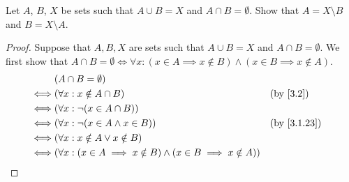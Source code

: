 \begin{ex}\label{ex:3.1.9}
  Let \(A\), \(B\), \(X\) be sets such that \(A \cup B = X\) and \(A \cap B = \emptyset\).
  Show that \(A = X \setminus B\) and \(B = X \setminus A\).
\end{ex}

\begin{proof}
  Suppose that \(A, B, X\) are sets such that \(A \cup B = X\) and \(A \cap B = \emptyset\).
  We first show that \(A \cap B = \emptyset \iff \forall x : (x \in A \implies x \notin B) \land (x \in B \implies x \notin A)\).
  \begin{align*}
         & (A \cap B = \emptyset)                                                                                         \\
    \iff & (\forall x : x \notin A \cap B)                                                 &  & \text{(by \cref{3.2})}    \\
    \iff & (\forall x : \lnot (x \in A \cap B))                                                                           \\
    \iff & (\forall x : \lnot (x \in A \land x \in B))                                     &  & \text{(by \cref{3.1.23})} \\
    \iff & (\forall x : x \notin A \lor x \notin B)                                                                       \\
    \iff & (\forall x : (x \in A \implies x \notin B) \land (x \in B \implies x \notin A))                                \\
  \end{align*}


\end{proof}
